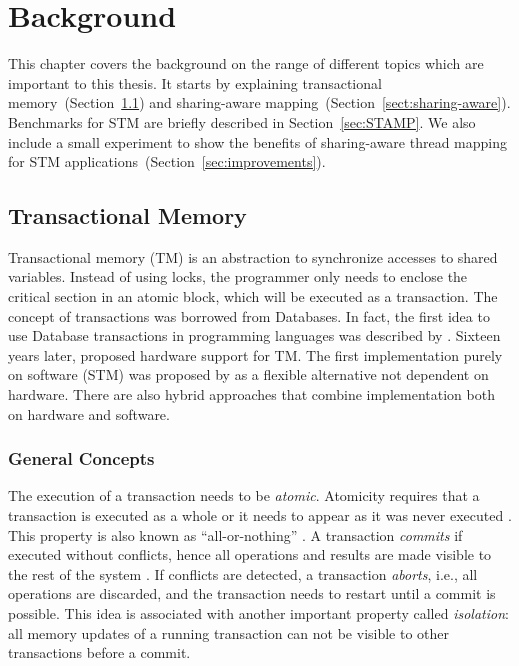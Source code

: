 \chapter{Background}\label{chap:background}

This chapter covers the background on the range of different topics which are important to this thesis. It starts by explaining transactional memory~(Section~\ref{chap:TM}) and sharing-aware mapping~(Section~\ref{sect:sharing-aware}). Benchmarks for STM are briefly described in Section~\ref{sec:STAMP}. We also include a small experiment to show the benefits of sharing-aware thread mapping for STM applications~(Section~\ref{sec:improvements}).

\section{Transactional Memory}\label{chap:TM}

Transactional memory (TM) is an abstraction to synchronize accesses to shared variables. Instead of using locks, the programmer only needs to enclose the critical section in an atomic block, which will be executed as a transaction. The concept of transactions was borrowed from Databases. In fact, the first idea to use Database transactions in programming languages was described by . Sixteen years later,  proposed hardware support for TM. The first implementation purely on software (STM) was proposed by  as a flexible alternative not dependent on hardware. There are also hybrid approaches \cite{Damron:2006} that combine implementation both on hardware and software.


\subsection{General Concepts}\label{sec:TMConcepts}

The execution of a transaction needs to be \emph{atomic}. Atomicity requires that a transaction is executed as a whole or it needs to appear as it was never executed \cite{Harris:2010, Grahn:2010}. This property is also known as ``all-or-nothing'' \cite{Ozsu:1996}. A transaction \emph{commits} if executed without conflicts, hence all operations and results are made visible to the rest of the system \cite{Grahn:2010}. If conflicts are detected, a transaction \emph{aborts}, i.e., all operations are discarded, and the transaction needs to restart until a commit is possible. This idea is associated with another important property called \emph{isolation}: all memory updates of a running transaction can not be visible to other transactions before a commit.


